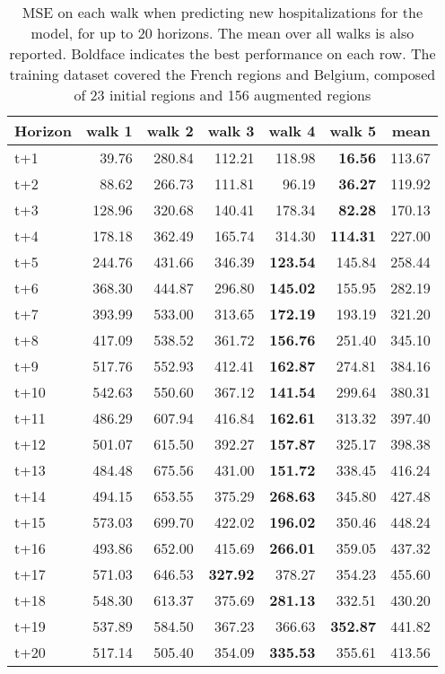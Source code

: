 \begin{table}[H]
\centering
\caption{MSE on each walk when predicting new hospitalizations for the model, for up to 20 horizons. The mean over all walks is also reported. Boldface indicates the best performance on each row. The training dataset covered the French regions and Belgium, composed of 23 initial regions and 156 augmented regions }
\label{tab:MSE_walk_dense_model}
\begin{tabular}{lrrrrrr}
\toprule
Horizon &  walk 1 &  walk 2 &  walk 3 &  walk 4 &  walk 5 &   mean \\
\midrule
t+1  & 39.76  & 280.84  & 112.21  & 118.98  & \textbf{16.56}  & 113.67  \\
t+2  & 88.62  & 266.73  & 111.81  & 96.19  & \textbf{36.27}  & 119.92  \\
t+3  & 128.96  & 320.68  & 140.41  & 178.34  & \textbf{82.28}  & 170.13  \\
t+4  & 178.18  & 362.49  & 165.74  & 314.30  & \textbf{114.31}  & 227.00  \\
t+5  & 244.76  & 431.66  & 346.39  & \textbf{123.54}  & 145.84  & 258.44  \\
t+6  & 368.30  & 444.87  & 296.80  & \textbf{145.02}  & 155.95  & 282.19  \\
t+7  & 393.99  & 533.00  & 313.65  & \textbf{172.19}  & 193.19  & 321.20  \\
t+8  & 417.09  & 538.52  & 361.72  & \textbf{156.76}  & 251.40  & 345.10  \\
t+9  & 517.76  & 552.93  & 412.41  & \textbf{162.87}  & 274.81  & 384.16  \\
t+10  & 542.63  & 550.60  & 367.12  & \textbf{141.54}  & 299.64  & 380.31  \\
t+11  & 486.29  & 607.94  & 416.84  & \textbf{162.61}  & 313.32  & 397.40  \\
t+12  & 501.07  & 615.50  & 392.27  & \textbf{157.87}  & 325.17  & 398.38  \\
t+13  & 484.48  & 675.56  & 431.00  & \textbf{151.72}  & 338.45  & 416.24  \\
t+14  & 494.15  & 653.55  & 375.29  & \textbf{268.63}  & 345.80  & 427.48  \\
t+15  & 573.03  & 699.70  & 422.02  & \textbf{196.02}  & 350.46  & 448.24  \\
t+16  & 493.86  & 652.00  & 415.69  & \textbf{266.01}  & 359.05  & 437.32  \\
t+17  & 571.03  & 646.53  & \textbf{327.92}  & 378.27  & 354.23  & 455.60  \\
t+18  & 548.30  & 613.37  & 375.69  & \textbf{281.13}  & 332.51  & 430.20  \\
t+19  & 537.89  & 584.50  & 367.23  & 366.63  & \textbf{352.87}  & 441.82  \\
t+20  & 517.14  & 505.40  & 354.09  & \textbf{335.53}  & 355.61  & 413.56  \\

\bottomrule
\end{tabular}
\end{table}
